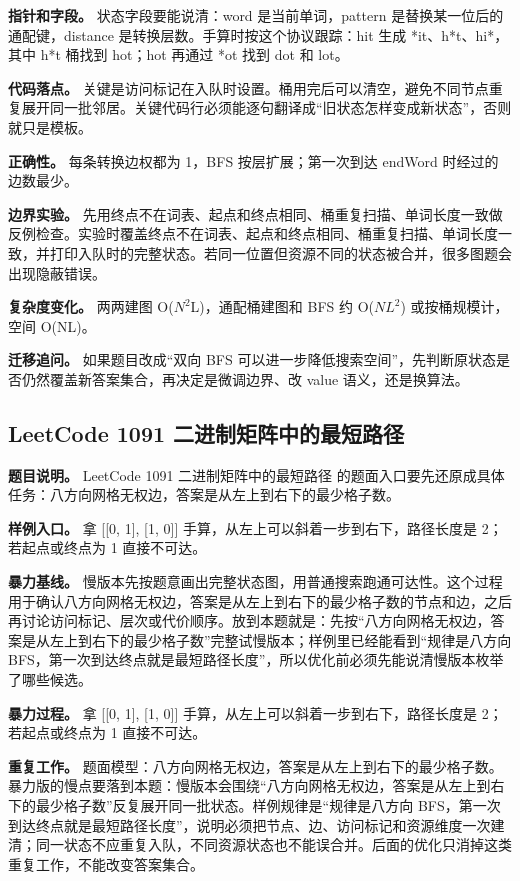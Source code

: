 \textbf{指针和字段。} 状态字段要能说清：word 是当前单词，pattern 是替换某一位后的通配键，distance 是转换层数。手算时按这个协议跟踪：hit 生成 *it、h*t、hi*，其中 h*t 桶找到 hot；hot 再通过 *ot 找到 dot 和 lot。

\textbf{代码落点。} 关键是访问标记在入队时设置。桶用完后可以清空，避免不同节点重复展开同一批邻居。关键代码行必须能逐句翻译成“旧状态怎样变成新状态”，否则就只是模板。

\textbf{正确性。} 每条转换边权都为 1，BFS 按层扩展；第一次到达 endWord 时经过的边数最少。

\textbf{边界实验。} 先用终点不在词表、起点和终点相同、桶重复扫描、单词长度一致做反例检查。实验时覆盖终点不在词表、起点和终点相同、桶重复扫描、单词长度一致，并打印入队时的完整状态。若同一位置但资源不同的状态被合并，很多图题会出现隐蔽错误。

\textbf{复杂度变化。} 两两建图 O(\ensuremath{N^{2}}L)，通配桶建图和 BFS 约 O(\ensuremath{NL^{2}}) 或按桶规模计，空间 O(NL)。

\textbf{迁移追问。} 如果题目改成“双向 BFS 可以进一步降低搜索空间”，先判断原状态是否仍然覆盖新答案集合，再决定是微调边界、改 value 语义，还是换算法。

\subsection{LeetCode 1091 二进制矩阵中的最短路径}

\textbf{题目说明。} LeetCode 1091 二进制矩阵中的最短路径 的题面入口要先还原成具体任务：八方向网格无权边，答案是从左上到右下的最少格子数。

\textbf{样例入口。} 拿 [[0, 1], [1, 0]] 手算，从左上可以斜着一步到右下，路径长度是 2；若起点或终点为 1 直接不可达。

\textbf{暴力基线。} 慢版本先按题意画出完整状态图，用普通搜索跑通可达性。这个过程用于确认八方向网格无权边，答案是从左上到右下的最少格子数的节点和边，之后再讨论访问标记、层次或代价顺序。放到本题就是：先按“八方向网格无权边，答案是从左上到右下的最少格子数”完整试慢版本；样例里已经能看到“规律是八方向 BFS，第一次到达终点就是最短路径长度”，所以优化前必须先能说清慢版本枚举了哪些候选。

\textbf{暴力过程。} 拿 [[0, 1], [1, 0]] 手算，从左上可以斜着一步到右下，路径长度是 2；若起点或终点为 1 直接不可达。

\textbf{重复工作。} 题面模型：八方向网格无权边，答案是从左上到右下的最少格子数。暴力版的慢点要落到本题：慢版本会围绕“八方向网格无权边，答案是从左上到右下的最少格子数”反复展开同一批状态。样例规律是“规律是八方向 BFS，第一次到达终点就是最短路径长度”，说明必须把节点、边、访问标记和资源维度一次建清；同一状态不应重复入队，不同资源状态也不能误合并。后面的优化只消掉这类重复工作，不能改变答案集合。

